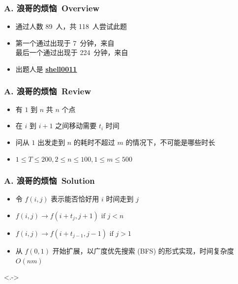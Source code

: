 \documentclass[notheorems]{beamer}
\newcommand{\zhProbA}{浪哥的烦恼}	\newcommand{\AuthProbA}{\textbf{\underline{\href{http://codeforces.com/profile/shell0011}{shell0011}}}}
\newcommand{\AccInProbA}{89}	\newcommand{\SubInProbA}{118}	\newcommand{\RatInProbA}{75.42\%}
\newcommand{\FirPenInProbA}{7}		\newcommand{\FirPerInProbA}{\NONE}
\newcommand{\LasPenInProbA}{224}	\newcommand{\LasPerInProbA}{\NONE}
\begin{document}
\begin{frame}[label = ProbA]
\frametitle{A. \zhProbA\ Overview}
\begin{spacing}{2.0} \large
\begin{itemize}[<+->]
\item 通过人数 \AccInProbA\ 人，共 \SubInProbA\ 人尝试此题
\item 第一个通过出现于 \FirPenInProbA\ 分钟，来自 \FirPerInProbA\ 
\\ 最后一个通过出现于 \LasPenInProbA\ 分钟，来自 \LasPerInProbA\ 
\item 出题人是 \AuthProbA\
\end{itemize}
\end{spacing}
\end{frame}
\begin{frame}
\frametitle{A. \zhProbA\ Review}
\begin{spacing}{2.0} \large
\begin{itemize}[<+->]
\item 有 $1$ 到 $n$ 共 $n$ 个点
\item 在 $i$ 到 $i + 1$ 之间移动需要 $t_i$ 时间
\item 问从 $1$ 出发走到 $n$ 的耗时不超过 $m$ 的情况下，不可能是哪些时长
\item $1 \leq T \leq 200, 2 \leq n \leq 100, 1 \leq m \leq 500$
\end{itemize}
\end{spacing}
\end{frame}
\begin{frame}
\frametitle{A. \zhProbA\ Solution}
\begin{spacing}{2.0} \large
\begin{itemize}[<+->]
\item 令 $f(i, j)$ 表示能否恰好用 $i$ 时间走到 $j$
\item $f(i, j) \rightarrow f(i + t_j, j + 1) \text{ if } j < n$
\item $f(i, j) \rightarrow f(i + t_{j - 1}, j - 1) \text{ if } j > 1$
\item 从 $f(0, 1)$ 开始扩展，以广度优先搜索 (BFS) 的形式实现，时间复杂度 $O(nm)$
\end{itemize}
\end{spacing}
\visible<.->{\hyperlink{Overview}{}}
\end{frame}
\end{document}
